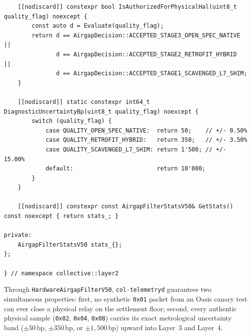 \begin{lstlisting}
    [[nodiscard]] constexpr bool IsAuthorizedForPhysicalHal(uint8_t quality_flag) noexcept {
        const auto d = Evaluate(quality_flag);
        return d == AirgapDecision::ACCEPTED_STAGE3_OPEN_SPEC_NATIVE ||
               d == AirgapDecision::ACCEPTED_STAGE2_RETROFIT_HYBRID  ||
               d == AirgapDecision::ACCEPTED_STAGE1_SCAVENGED_L7_SHIM;
    }

    [[nodiscard]] static constexpr int64_t DiagnosticUncertaintyBp(uint8_t quality_flag) noexcept {
        switch (quality_flag) {
            case QUALITY_OPEN_SPEC_NATIVE:  return 50;    // +/- 0.50%
            case QUALITY_RETROFIT_HYBRID:   return 350;   // +/- 3.50%
            case QUALITY_SCAVENGED_L7_SHIM: return 1'500; // +/- 15.00%
            default:                        return 10'000;
        }
    }

    [[nodiscard]] constexpr const AirgapFilterStatsV50& GetStats() const noexcept { return stats_; }

private:
    AirgapFilterStatsV50 stats_{};
};

} // namespace collective::layer2
\end{lstlisting}

Through \texttt{HardwareAirgapFilterV50}, \texttt{col-telemetryd} guarantees two simultaneous properties: first, no synthetic \texttt{0x01} packet from an Oasis canary test can ever close a physical relay on the settlement floor; second, every authentic physical sample (\texttt{0x02}, \texttt{0x04}, \texttt{0x08}) carries its exact metrological uncertainty band ($\pm 50\,\mathrm{bp}$, $\pm 350\,\mathrm{bp}$, or $\pm 1{,}500\,\mathrm{bp}$) upward into Layer~3 and Layer~4.
